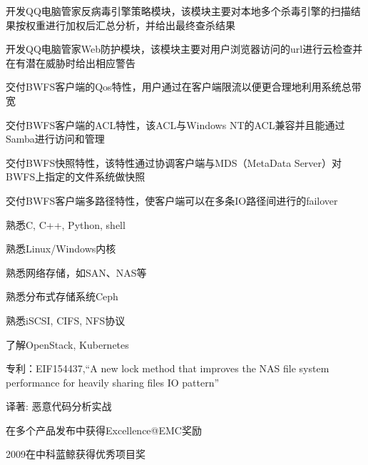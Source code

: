 \documentclass{CurriculumVitae} %
\begin{document}
\begin{CJK}{UTF8}{gbsn}
\begin{achievements}
\item 开发QQ电脑管家反病毒引擎策略模块，该模块主要对本地多个杀毒引擎的扫描结果按权重进行加权后汇总分析，并给出最终查杀结果
\item 开发QQ电脑管家Web防护模块，该模块主要对用户浏览器访问的url进行云检查并在有潜在威胁时给出相应警告
\end{achievements}

\begin{achievements}
\item 交付BWFS客户端的Qos特性，用户通过在客户端限流以便更合理地利用系统总带宽
\item 交付BWFS客户端的ACL特性，该ACL与Windows NT的ACL兼容并且能通过Samba进行访问和管理
\item 交付BWFS快照特性，该特性通过协调客户端与MDS（MetaData Server）对BWFS上指定的文件系统做快照
\item 交付BWFS客户端多路径特性，使客户端可以在多条IO路径间进行的failover
\end{achievements}

\begin{achievements}
\item 熟悉C, C++, Python, shell
\item 熟悉Linux/Windows内核
\item 熟悉网络存储，如SAN、NAS等
\item 熟悉分布式存储系统Ceph
\item 熟悉iSCSI, CIFS, NFS协议
\item 了解OpenStack, Kubernetes
\end{achievements}

\begin{achievements}
\item 专利：EIF154437,“A new lock method that improves the NAS file system performance for heavily sharing files IO pattern”
\item 译著: 恶意代码分析实战
\item 在多个产品发布中获得Excellence@EMC奖励
\item 2009在中科蓝鲸获得优秀项目奖
\end{achievements}

\end{CJK}
\end{document}
